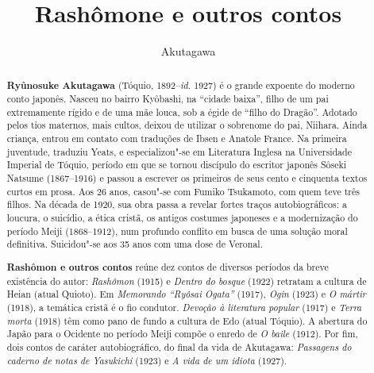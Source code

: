 \documentclass[12pt]{extarticle}
\begin{document}
\newcommand{\AutorLivro}{Akutagawa}
\newcommand{\TituloLivro}{Rashômone e outros contos}
\newcommand{\Tema}{Ficção, mistério e fantasia}
\newcommand{\Genero}{Conto, crônica e novela}
\newcommand{\imagemCapa}{./images/PNLD0009-01.png}
\newcommand{\issnppub}{---}
\newcommand{\issnepub}{---}
\newcommand{\colaborador}{\textbf{Cesar Augusto Araujo Oyakawa, Bruno Gradella e Vicente Castro}}


\title{\TituloLivro}
\author{\AutorLivro}
\def\authornotes{\colaborador}

\date{}
\maketitle

\baselineskip\par

\begin{abstract}

\textbf{Ryûnosuke Akutagawa} (Tóquio, 1892--\textit{id.} 1927) é o grande
  expoente do moderno conto japonês. Nasceu no bairro Kyôbashi, na ``cidade
  baixa'', filho de um pai extremamente rígido e de uma mãe louca, sob a égide
  de ``filho do Dragão''. Adotado pelos tios maternos, mais cultos, deixou de
  utilizar o sobrenome do pai, Niihara. Ainda criança, entrou em contato com
  traduções de Ibsen e Anatole France. Na primeira juventude, traduziu Yeats, e
  especializou"-se em Literatura Inglesa na Universidade Imperial de Tóquio,
  período em que se tornou discípulo do escritor japonês Sôseki Natsume
  (1867--1916) e passou a escrever os primeiros de seus cento e cinquenta
  textos curtos em prosa. Aos 26 anos, casou"-se com Fumiko Tsukamoto, com quem
  teve três filhos.  Na década de 1920, sua obra passa a revelar fortes traços
  autobiográficos: a loucura, o suicídio, a ética cristã, os antigos costumes
  japoneses e a modernização do período Meiji (1868--1912), num profundo
  conflito em busca de uma solução moral definitiva.  Suicidou"-se aos 35 anos
  com uma dose de Veronal. 
        
\textbf{Rashômon e outros contos} reúne dez contos de diversos períodos da
  breve existência do autor: \textit{Rashômon} (1915) e \textit{Dentro do
  bosque} (1922) retratam a cultura de Heian (atual Quioto). Em
  \textit{Memorando ``Ryôsai Ogata''} (1917), \textit{Ogin} (1923) e \textit{O
  mártir} (1918), a temática cristã é o fio condutor.  \textit{Devoção à
  literatura popular} (1917) e \textit{Terra morta} (1918) têm como pano de
  fundo a cultura de Edo (atual Tóquio). A abertura do Japão para o Ocidente no
  período Meiji compõe o enredo de \textit{O baile} (1912). Por fim, dois
  contos de caráter autobiográfico, do final da vida de Akutagawa:
  \textit{Passagens do caderno de notas de Yasukichi} (1923) e \textit{A vida
de um idiota} (1927).      \end{abstract}
\end{document}
